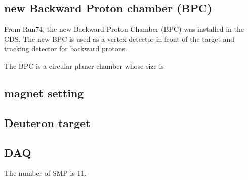 \subsection{new Backward Proton chamber (BPC)}
From Run74, the new Backward Proton Chamber (BPC) was installed in the CDS. The new BPC is used as a vertex detector in front of the target and tracking detector for backward protons.


The BPC is a circular planer chamber whose size is 


\subsection{magnet setting}

\subsection{Deuteron target}

\subsection{DAQ}
The number of SMP is 11. 

